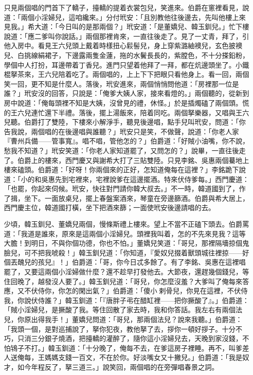 只見兩個唱的門首下了轎子，擡轎的提着衣裳包兒，笑進來。伯爵在窻裡看見，說道：「兩個小淫婦兒，這咱纔來。」分付玳安：「且別教他往後邊去，先叫他樓上來見我。」希大道：「今日叫的是那兩個？」玳安道：「是董嬌兒、韓玉釧兒。」忙下樓說道：「應二爹叫你說話。」兩個那裡肯來，一直往後走了。見了一丈青，拜了，引他入房中。看見王六兒頭上戴着時樣扭心鬏髻兒，身上穿紫潞紬襖兒，玄色披襖兒、白挑線絹裙子，下邊露兩隻金蓮，拖的水鬢長長的，紫膛色，不十分搽鉛粉，學個中人打扮，耳邊帶着丁香兒。進門只望着他拜了一拜，都在炕邊頭坐了。小鐵棍拏茶來，王六兒陪着吃了。兩個唱的，上上下下把眼只看他身上。看一回，兩個笑一回，更不知是什麼人。落後，玳安進來，兩個悄悄問他道：「房裡那一位是誰？」玳安沒的回答，只說是：「俺爹大姨人家，接來看燈的。」兩個聽的，從新到房中說道：「俺每頭裡不知是大姨，沒曾見的禮，休怪。」於是插燭磕了兩個頭。慌的王六兒連忙還下半禮。落後，擺上湯飯來，陪着同吃。兩個拏樂器，又唱與王六兒聽。伯爵打了雙陸，下樓來小解淨手，聽見後邊唱，點手兒叫玳安，{}問道：「你告我說，兩個唱的在後邊唱與誰聽？」玳安只是笑，不做聲，說道：「你老人家『曹州兵備——管事寬』。唱不唱，管他怎的？」伯爵道：「好賊小油嘴，你不說，愁我不知道？」玳安笑道：「你老人家知道罷了，又問怎的？」說畢，一直往後走了。{}伯爵上的樓來，西門慶又與謝希大打了三貼雙陸。只見李銘、吳惠兩個驀地上樓來磕頭。伯爵道：「好呀！你兩個來的正好，怎知道俺每在這裡？」李銘跪下說道：「小的和吳惠先到宅裡來，宅裡說爹在這邊擺酒。特來伏侍爹每。」西門慶道：「也罷，你起來伺候。玳安，快往對門請你韓大叔去。」不一時，韓道國到了，作了揖，坐下。一面放桌兒，擺上春盤案酒來，琴童在旁邊篩酒。伯爵與希大居上，西門慶主位，韓道國打橫，坐下把酒來篩；一面使玳安後邊請唱的去。

少頃，韓玉釧兒、董嬌兒兩個，慢條斯禮上樓來。望上不當不正磕下頭去。伯爵罵道：「我道是誰來，原來是這兩個小淫婦兒。頭裡我叫着，怎的不先來見我？這等大膽！到明日，不與你個功德，你也不怕。」董嬌兒笑道：「哥兒，那裡隔墻掠個鬼臉兒，可不把我唬殺！」韓玉釧兒道：「你知道，『愛奴兒掇着獸頭城往裡掠——好個丟醜兒的孩兒』！」伯爵道：「哥，你今日忒多餘了。有了李銘、吳惠在這裡唱罷了，又要這兩個小淫婦做什麼？還不趁早打發他去。大節夜，還趕幾個錢兒，等住回晚了，越發沒人要了。」韓玉釧兒道：「哥兒，你怎麼沒羞？大爹叫了俺每來答應，又不伏侍你，你怎的閑出氣？」伯爵道：「傻小𢱉剌骨兒，你見在這裡，不伏侍我，你說伏侍誰？」韓玉釧道：「『唐胖子弔在醋缸裡——把你撅酸了』。」伯爵道：「賊小淫婦兒，是撅酸了我。等住回散了家去時，我和你答話。我左右有兩個法兒，你原出得我手！」董嬌兒問道：「哥兒，那兩個法兒？說來我聽。」伯爵道：「我頭一個，是對巡捕說了，拏你犯夜，教他拏了去，拶你一頓好拶子。十分不巧，只消三分銀子燒酒，把擡轎的灌醉了，隨你這小淫婦兒去，天晚到家沒錢，不怕鴇子不打。」韓玉釧道：「十分晚了，俺每不去，在爹這房子裡睡。再不，叫爹差人送俺每，王媽媽支錢一百文，不在於你。好淡嘴女又十撇兒。」{}伯爵道：「我是奴才，如今年程反了，拏三道三。」說笑回，兩個唱的在旁彈唱春景之詞。

